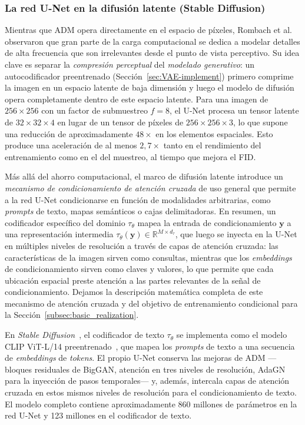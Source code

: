 \documentclass[../../book-main_es.tex]{subfiles}
\begin{document}
\subsubsection{La red U-Net en la difusión latente (Stable Diffusion)}
\label{sec:unet-ldm}

Mientras que ADM opera directamente en el espacio de píxeles, Rombach et al.~\citep{rombach2022high} 
observaron que gran parte de la carga computacional se dedica a modelar detalles de alta frecuencia 
que son irrelevantes desde el punto de vista perceptivo. Su idea clave es separar 
la \emph{compresión perceptual} del \emph{modelado generativo}: un autocodificador preentrenado 
(Sección~\ref{sec:VAE-implement}) primero comprime la imagen en un espacio latente de baja dimensión 
y luego el modelo de difusión opera completamente dentro de este espacio latente. Para una imagen de 
$256 \times 256$ con un factor de submuestreo $f = 8$, el U-Net procesa un tensor latente de 
$32 \times 32 \times 4$ en lugar de un tensor de píxeles de $256 \times 256 \times 3$, lo que supone 
una reducción de aproximadamente $48\times$ en los elementos espaciales. Esto produce una aceleración 
de al menos $2,7\times$ tanto en el rendimiento del entrenamiento como en el del muestreo, al tiempo 
que mejora el FID.

Más allá del ahorro computacional, el marco de difusión latente introduce un \emph{mecanismo de 
condicionamiento de atención cruzada} de uso general que permite a la red U-Net condicionarse en 
función de modalidades arbitrarias, como \textit{prompts} de texto, mapas semánticos o cajas 
delimitadoras. En resumen, un codificador específico del dominio $\tau_\theta$ mapea la entrada 
de condicionamiento $\boldsymbol{y}$ a una representación intermedia 
$\tau_\theta(\boldsymbol{y}) \in \mathbb{R}^{M \times d_\tau}$, que luego se inyecta en la U-Net 
en múltiples niveles de resolución a través de capas de atención cruzada: las características de 
la imagen sirven como consultas, mientras que los \textit{embeddings} de condicionamiento sirven como 
claves y valores, lo que permite que cada ubicación espacial preste atención a las partes relevantes 
de la señal de condicionamiento. Dejamos la descripción matemática completa de este mecanismo de 
atención cruzada y del objetivo de entrenamiento condicional para la Sección~\ref{subsec:basic_realization}.

En \textit{Stable Diffusion}~\citep{rombach2022high}, el codificador de texto $\tau_\theta$ se implementa como 
el modelo CLIP ViT-L/14 preentrenado~\citep{radford2021learning}, que mapea los \textit{prompts} de texto 
a una secuencia de \textit{embeddings} de \textit{tokens}. El propio U-Net conserva las mejoras de ADM ---bloques 
residuales de BigGAN, atención en tres niveles de resolución, AdaGN para la inyección de pasos 
temporales--- y, además, intercala capas de atención cruzada en estos mismos niveles de resolución 
para el condicionamiento de texto. El modelo completo contiene aproximadamente 860 millones de 
parámetros en la red U-Net y 123 millones en el codificador de texto.
\end{document}

